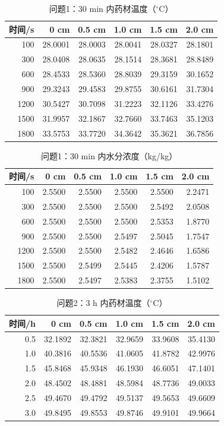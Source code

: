 \begin{table}[H]
\centering
\caption{问题1：30 min 内药材温度（$^\circ$C）}\label{tab:q1t}
\small
\begin{tabular}{rrrrrr}
\toprule
时间/s & 0 cm & 0.5 cm & 1.0 cm & 1.5 cm & 2.0 cm \\
\midrule
100 & 28.0001 & 28.0003 & 28.0041 & 28.0327 & 28.1801 \\
300 & 28.0408 & 28.0635 & 28.1514 & 28.3681 & 28.8489 \\
600 & 28.4533 & 28.5360 & 28.8039 & 29.3159 & 30.1652 \\
900 & 29.3243 & 29.4583 & 29.8755 & 30.6161 & 31.7304 \\
1200 & 30.5427 & 30.7098 & 31.2223 & 32.1126 & 33.4276 \\
1500 & 31.9957 & 32.1867 & 32.7660 & 33.7463 & 35.1203 \\
1800 & 33.5753 & 33.7720 & 34.3642 & 35.3621 & 36.7856 \\
\bottomrule
\end{tabular}
\end{table}

\begin{table}[H]
\centering
\caption{问题1：30 min 内水分浓度（kg/kg）}\label{tab:q1c}
\small
\begin{tabular}{rrrrrr}
\toprule
时间/s & 0 cm & 0.5 cm & 1.0 cm & 1.5 cm & 2.0 cm \\
\midrule
100 & 2.5500 & 2.5500 & 2.5500 & 2.5500 & 2.2471 \\
300 & 2.5500 & 2.5500 & 2.5500 & 2.5492 & 2.0508 \\
600 & 2.5500 & 2.5500 & 2.5500 & 2.5353 & 1.8770 \\
900 & 2.5500 & 2.5500 & 2.5497 & 2.5045 & 1.7547 \\
1200 & 2.5500 & 2.5500 & 2.5482 & 2.4646 & 1.6586 \\
1500 & 2.5500 & 2.5499 & 2.5445 & 2.4206 & 1.5787 \\
1800 & 2.5500 & 2.5497 & 2.5383 & 2.3755 & 1.5102 \\
\bottomrule
\end{tabular}
\end{table}

\begin{table}[H]
\centering
\caption{问题2：3 h 内药材温度（$^\circ$C）}\label{tab:q2t}
\small
\begin{tabular}{rrrrrr}
\toprule
时间/h & 0 cm & 0.5 cm & 1.0 cm & 1.5 cm & 2.0 cm \\
\midrule
0.5 & 32.1892 & 32.3821 & 32.9659 & 33.9608 & 35.4130 \\
1.0 & 40.3816 & 40.5536 & 41.0605 & 41.8782 & 42.9976 \\
1.5 & 45.8468 & 45.9348 & 46.1930 & 46.6051 & 47.1401 \\
2.0 & 48.4502 & 48.4881 & 48.5984 & 48.7736 & 49.0033 \\
2.5 & 49.4670 & 49.4792 & 49.5137 & 49.5653 & 49.6609 \\
3.0 & 49.8495 & 49.8553 & 49.8746 & 49.9101 & 49.9664 \\
\bottomrule
\end{tabular}
\end{table}

